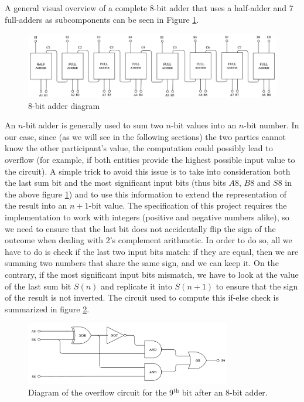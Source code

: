 \documentclass[12pt]{article}
\begin{document}
A general visual overview of a complete 8-bit adder that uses a half-adder and 7 full-adders as subcomponents can be seen in Figure \ref{fig:adder}.

\begin{figure}[h]
  \centering
  \includegraphics[width=\textwidth]{adder.png}
  \caption{8-bit adder diagram}\label{fig:adder}
\end{figure}

An $n$-bit adder is generally used to sum two $n$-bit values into an $n$-bit number. In our case, since (as we will see in the following sections) the two parties cannot know the other participant's value, the computation could possibly lead to overflow (for example, if both entities provide the highest possible input value to the circuit). A simple trick to avoid this issue is to take into consideration both the last sum bit and the most significant input bits (thus bits $A8$, $B8$ and $S8$ in the above figure \ref{fig:adder}) and to use this information to extend the representation of the result into an $n+1$-bit value. The specification of this project requires the implementation to work with integers (positive and negative numbers alike), so we need to ensure that the last bit does not accidentally flip the sign of the outcome when dealing with 2's complement arithmetic. In order to do so, all we have to do is check if the last two input bits match: if they are equal, then we are summing two numbers that share the same sign, and we can keep it. On the contrary, if the most significant input bits mismatch, we have to look at the value of the last sum bit $S(n)$ and replicate it into $S(n+1)$ to ensure that the sign of the result is not inverted. The circuit used to compute this if-else check is summarized in figure \ref{fig:overflow}.

\begin{figure}[t]
  \centering
  \includegraphics[width=0.8\textwidth]{overflow.png}
  \caption{Diagram of the overflow circuit for the 9$^{\textrm{th}}$ bit after an 8-bit adder.}\label{fig:overflow}
\end{figure}
\end{document}
